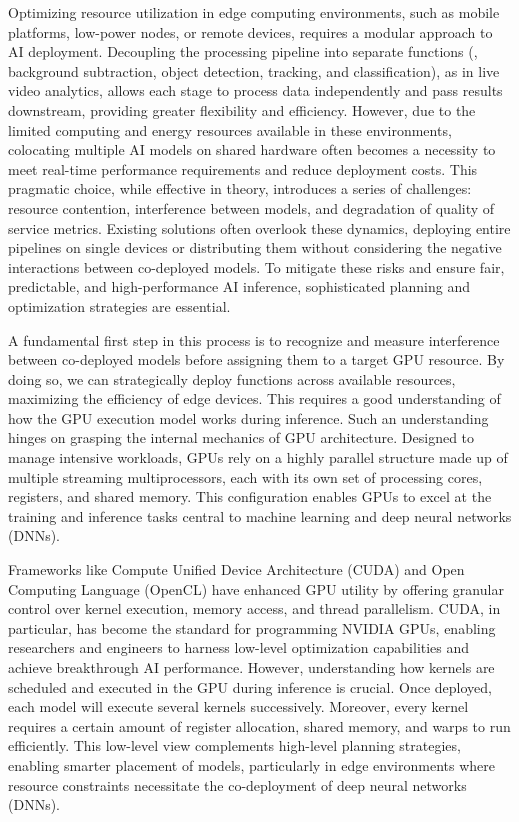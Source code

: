 Optimizing resource utilization in edge computing environments, such as mobile platforms, low-power nodes, or remote devices, requires a modular approach to AI deployment. Decoupling the processing pipeline into separate functions (\eg, background subtraction, object detection, tracking, and classification), as in live video analytics, allows each stage to process data independently and pass results downstream, providing greater flexibility and efficiency. However, due to the limited computing and energy resources available in these environments, colocating multiple AI models on shared hardware often becomes a necessity to meet real-time performance requirements and reduce deployment costs. This pragmatic choice, while effective in theory, introduces a series of challenges: resource contention, interference between models, and degradation of quality of service metrics. Existing solutions often overlook these dynamics, deploying entire pipelines on single devices or distributing them without considering the negative interactions between co-deployed models. To mitigate these risks and ensure fair, predictable, and high-performance AI inference, sophisticated planning and optimization strategies are essential.

A fundamental first step in this process is to recognize and measure interference between co-deployed models before assigning them to a target GPU resource. By doing so, we can strategically deploy functions across available resources, maximizing the efficiency of edge devices. This requires a good understanding of how the GPU execution model works during inference. Such an understanding hinges on grasping the internal mechanics of GPU architecture. Designed to manage intensive workloads, GPUs rely on a highly parallel structure made up of multiple streaming multiprocessors, each with its own set of processing cores, registers, and shared memory. This configuration enables GPUs to excel at the training and inference tasks central to machine learning and deep neural networks (DNNs).

Frameworks like Compute Unified Device Architecture (CUDA) and Open Computing Language (OpenCL) have enhanced GPU utility by offering granular control over kernel execution, memory access, and thread parallelism. CUDA, in particular, has become the standard for programming NVIDIA GPUs, enabling researchers and engineers to harness low-level optimization capabilities and achieve breakthrough AI performance. However, understanding how kernels are scheduled and executed in the GPU during inference is crucial. Once deployed, each model will execute several kernels successively. Moreover, every kernel requires a certain amount of register allocation, shared memory, and warps to run efficiently. This low-level view complements high-level planning strategies, enabling smarter placement of models, particularly in edge environments where resource constraints necessitate the co-deployment of deep neural networks (DNNs).


